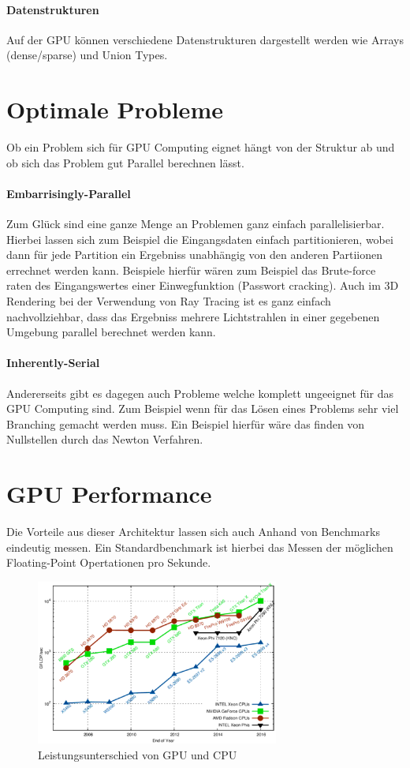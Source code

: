 \documentclass[10pt,twocolumn]{article}          %
\begin{document}
\paragraph{Datenstrukturen} Auf der GPU k\"onnen verschiedene Datenstrukturen dargestellt werden wie Arrays (dense/sparse) und Union Types.

\section{Optimale Probleme}
Ob ein Problem sich f\"ur GPU Computing eignet h\"angt von der Struktur ab und ob sich das Problem gut Parallel berechnen l\"asst.

\paragraph{Embarrisingly-Parallel}
Zum Gl\"uck sind eine ganze Menge an Problemen ganz einfach parallelisierbar. 
Hierbei lassen sich zum Beispiel die Eingangsdaten einfach partitionieren, wobei dann f\"ur jede Partition ein Ergebniss unabh\"angig von den anderen Partiionen errechnet werden kann.
Beispiele hierf\"ur w\"aren zum Beispiel das Brute-force raten des Eingangswertes einer Einwegfunktion (Passwort cracking). 
Auch im 3D Rendering bei der Verwendung von Ray Tracing ist es ganz einfach nachvollziehbar, dass das Ergebniss mehrere Lichtstrahlen in einer gegebenen Umgebung parallel berechnet werden kann.

\paragraph{Inherently-Serial}
Andererseits gibt es dagegen auch Probleme welche komplett ungeeignet f\"ur das GPU Computing sind.
Zum Beispiel wenn f\"ur das L\"osen eines Problems sehr viel Branching gemacht werden muss. 
Ein Beispiel hierf\"ur w\"are das finden von Nullstellen durch das Newton Verfahren.


\section{GPU Performance}
Die Vorteile aus dieser Architektur lassen sich auch Anhand von Benchmarks eindeutig messen.
Ein Standardbenchmark ist hierbei das Messen der m\"oglichen Floating-Point Opertationen pro Sekunde.

\begin{figure}[h]
  \begin{center}
  \includegraphics[width=8cm]{gflops.eps}
  \caption{Leistungsunterschied von GPU und CPU}
  \label{fig:flops}
  \end{center}
\end{figure}
\end{document}
